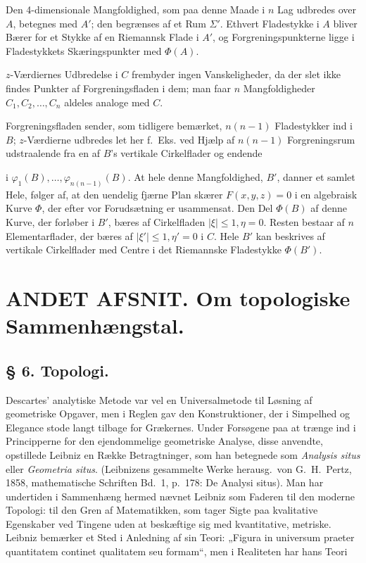 \documentclass{article}
\begin{document}
Den 4-dimensionale Mangfoldighed, som paa denne Maade i $n$ Lag udbredes over $A$, betegnes med $A'$; den begrænses af et Rum $\Sigma'$. Ethvert Fladestykke i $A$ bliver Bærer for et Stykke af en Riemannsk Flade i $A'$, og Forgreningspunkterne ligge i Fladestykkets Skæringspunkter med $\Phi(A)$.

$z$-Værdiernes Udbredelse i $C$ frembyder ingen Vanskeligheder, da der slet ikke findes Punkter af Forgreningsfladen i dem; man faar $n$ Mangfoldigheder $C_1, C_2, \dots, C_n$ aldeles analoge med $C$.

Forgreningsfladen sender, som tidligere bemærket, $n(n - 1)$ Fladestykker ind i $B$; $z$-Værdierne udbredes let her f.~Eks. ved Hjælp af $n(n - 1)$ Forgreningsrum udstraalende fra en af $B$'s vertikale Cirkelflader og endende

i $\varphi_1(B), \dots, \varphi_{n(n-1)}(B)$. At hele denne Mangfoldighed, $B'$, danner et samlet Hele, følger af, at den uendelig fjærne Plan skærer $F(x, y, z) = 0$ i en algebraisk Kurve $\Phi$, der efter vor Forudsætning er usammensat. Den Del $\Phi(B)$ af denne Kurve, der forløber i $B'$, bæres af Cirkelfladen $|\xi| \le 1, \eta = 0$. Resten bestaar af $n$ Elementarflader, der bæres af $|\xi'| \le 1, \eta' = 0$ i $C$. Hele $B'$ kan beskrives af vertikale Cirkelflader med Centre i det Riemannske Fladestykke $\Phi(B')$.

\section*{ANDET AFSNIT. Om topologiske Sammenhængstal.}

\subsection*{§ 6. Topologi.}

Descartes' analytiske Metode var vel en Universalmetode til Løsning af geometriske Opgaver, men i Reglen gav den Konstruktioner, der i Simpelhed og Elegance stode langt tilbage for Grækernes. Under Forsøgene paa at trænge ind i Principperne for den ejendommelige geometriske Analyse, disse anvendte, opstillede Leibniz en Række Betragtninger, som han betegnede som \emph{Analysis situs} eller \emph{Geometria situs}. (Leibnizens gesammelte Werke herausg.\ von G.~H.~Pertz, 1858, mathematische Schriften Bd.\ 1, p.\ 178: De Analysi situs). Man har undertiden i Sammenhæng hermed nævnet Leibniz som Faderen til den moderne Topologi: til den Gren af Matematikken, som tager Sigte paa kvalitative Egenskaber ved Tingene uden at beskæftige sig med kvantitative, metriske. Leibniz bemærker et Sted i Anledning af sin Teori: „Figura in universum praeter quantitatem continet qualitatem seu formam“, men i Realiteten har hans Teori
\end{document}
